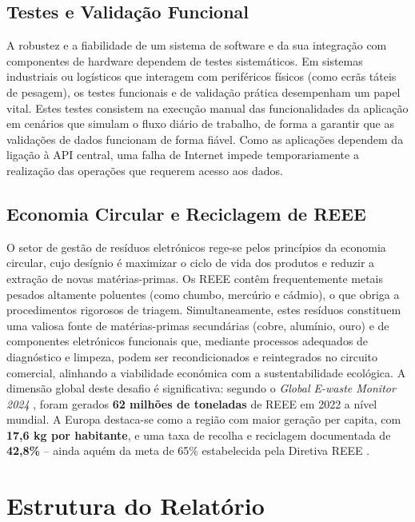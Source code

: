 \subsection{Testes e Validação Funcional}
A robustez e a fiabilidade de um sistema de software e da sua integração com componentes de hardware dependem de testes sistemáticos. Em sistemas industriais ou logísticos que interagem com periféricos físicos (como ecrãs táteis de pesagem), os testes funcionais e de validação prática desempenham um papel vital. Estes testes consistem na execução manual das funcionalidades da aplicação em cenários que simulam o fluxo diário de trabalho, de forma a garantir que as validações de dados funcionam de forma fiável. Como as aplicações dependem da ligação à API central, uma falha de Internet impede temporariamente a realização das operações que requerem acesso aos dados.

\subsection{Economia Circular e Reciclagem de REEE}
O setor de gestão de resíduos eletrónicos rege-se pelos princípios da economia circular, cujo desígnio é maximizar o ciclo de vida dos produtos e reduzir a extração de novas matérias-primas. Os REEE contêm frequentemente metais pesados altamente poluentes (como chumbo, mercúrio e cádmio), o que obriga a procedimentos rigorosos de triagem. Simultaneamente, estes resíduos constituem uma valiosa fonte de matérias-primas secundárias (cobre, alumínio, ouro) e de componentes eletrónicos funcionais que, mediante processos adequados de diagnóstico e limpeza, podem ser recondicionados e reintegrados no circuito comercial, alinhando a viabilidade económica com a sustentabilidade ecológica. A dimensão global deste desafio é significativa: segundo o \textit{Global E-waste Monitor 2024} \autocite{GlobalEwasteMonitor2024}, foram gerados \textbf{62 milhões de toneladas} de REEE em 2022 a nível mundial. A Europa destaca-se como a região com maior geração per capita, com \textbf{17,6 kg por habitante}, e uma taxa de recolha e reciclagem documentada de \textbf{42,8\%} -- ainda aquém da meta de 65\% estabelecida pela Diretiva REEE \autocite{REEE}.


\section{Estrutura do Relatório}

